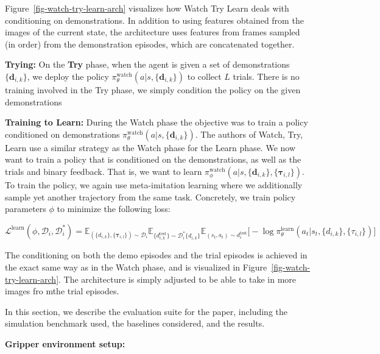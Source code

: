 \documentclass[
  letterpaper,
  numbers=noenddot,
  DIV=11]{scrreprt}
\theoremstyle{definition}
\theoremstyle{plain}
\theoremstyle{plain}
\theoremstyle{remark}
\begin{document}
Figure~\ref{fig-watch-try-learn-arch} visualizes how Watch Try Learn
deals with conditioning on demonstrations. In addition to using features
obtained from the images of the current state, the architecture uses
features from frames sampled (in order) from the demonstration episodes,
which are concatenated together.

\textbf{Trying:} On the \textbf{Try} phase, when the agent is given a
set of demonstrations \(\{\textbf{d}_{i,k}\}\), we deploy the policy
\(\pi_\theta^{\text{watch}}(a | s, \{\textbf{d}_{i,k}\})\) to collect
\(L\) trials. There is no training involved in the Try phase, we simply
condition the policy on the given demonstrations

\textbf{Training to Learn:} During the Watch phase the objective was to
train a policy conditioned on demonstrations
\(\pi_\theta^{\text{watch}}(a | s, \{\textbf{d}_{i,k}\})\). The authors
of Watch, Try, Learn use a similar strategy as the Watch phase for the
Learn phase. We now want to train a policy that is conditioned on the
demonstrations, as well as the trials and binary feedback. That is, we
want to learn
\(\pi_\phi^{\text{watch}}(a | s, \{\textbf{d}_{i,k}\}, \{\mathbf{\tau}_{i, l}\})\).
To train the policy, we again use meta-imitation learning where we
additionally sample yet another trajectory from the same task.
Concretely, we train policy parameters \(\phi\) to minimize the
following loss:

\(\mathcal{L}^{\text{learn}}(\phi, \mathcal{D}_i, \mathcal{D}_i^*) = \mathbb{E}_{(\{d_{i,k}\}, \{\mathbf{\tau}_{i,l}\}) \sim \mathcal{D}_i} \mathbb{E}_{\{d_{i,k}^{\text{test}}\} \sim \mathcal{D}_i^* \{d_{i,k}\}} \mathbb{E}_{(s_t, a_t) \sim d_i^{\text{test}}} \big[
- \log \pi_\theta^{\text{learn}} (a_t | s_t, \{d_{i,k}\}, \{\tau_{i,l}\}) \big]\)

The conditioning on both the demo episodes and the trial episodes is
achieved in the exact same way as in the Watch phase, and is visualized
in Figure~\ref{fig-watch-try-learn-arch}. The architecture is simply
adjusted to be able to take in more images fro mthe trial episodes.

In this section, we describe the evaluation suite for the paper,
including the simulation benchmark used, the baselines considered, and
the results.

\textbf{Gripper environment setup:}
\end{document}
